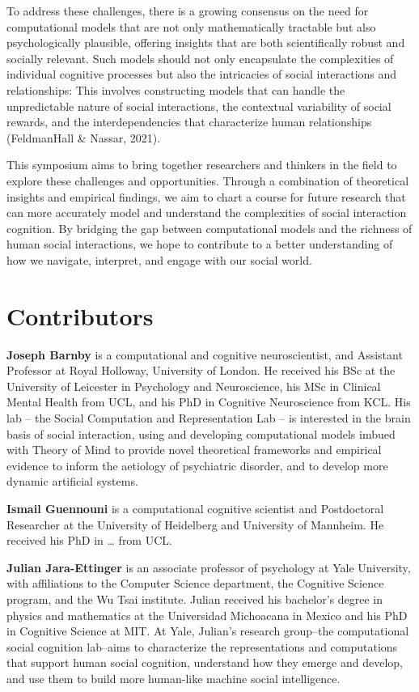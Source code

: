 \documentclass[10pt, letterpaper]{article}
\begin{document}
To address these challenges, there is a growing consensus on the need
for computational models that are not only mathematically tractable but
also psychologically plausible, offering insights that are both
scientifically robust and socially relevant. Such models should not only
encapsulate the complexities of individual cognitive processes but also
the intricacies of social interactions and relationships: This involves
constructing models that can handle the unpredictable nature of social
interactions, the contextual variability of social rewards, and the
interdependencies that characterize human relationships (FeldmanHall \&
Nassar, 2021).

This symposium aims to bring together researchers and thinkers in the
field to explore these challenges and opportunities. Through a
combination of theoretical insights and empirical findings, we aim to
chart a course for future research that can more accurately model and
understand the complexities of social interaction cognition. By bridging
the gap between computational models and the richness of human social
interactions, we hope to contribute to a better understanding of how we
navigate, interpret, and engage with our social world.

\hypertarget{contributors}{%
\section{Contributors}\label{contributors}}

\textbf{Joseph Barnby} is a computational and cognitive neuroscientist,
and Assistant Professor at Royal Holloway, University of London. He
received his BSc at the University of Leicester in Psychology and
Neuroscience, his MSc in Clinical Mental Health from UCL, and his PhD in
Cognitive Neuroscience from KCL. His lab -- the Social Computation and
Representation Lab -- is interested in the brain basis of social
interaction, using and developing computational models imbued with
Theory of Mind to provide novel theoretical frameworks and empirical
evidence to inform the aetiology of psychiatric disorder, and to develop
more dynamic artificial systems.

\textbf{Ismail Guennouni} is a computational cognitive scientist and
Postdoctoral Researcher at the University of Heidelberg and University
of Mannheim. He received his PhD in \ldots{} from UCL.

\textbf{Julian Jara-Ettinger} is an associate professor of psychology at
Yale University, with affiliations to the Computer Science department,
the Cognitive Science program, and the Wu Tsai institute. Julian
received his bachelor's degree in physics and mathematics at the
Universidad Michoacana in Mexico and his PhD in Cognitive Science at
MIT. At Yale, Julian's research group--the computational social
cognition lab--aims to characterize the representations and computations
that support human social cognition, understand how they emerge and
develop, and use them to build more human-like machine social
intelligence.
\end{document}
